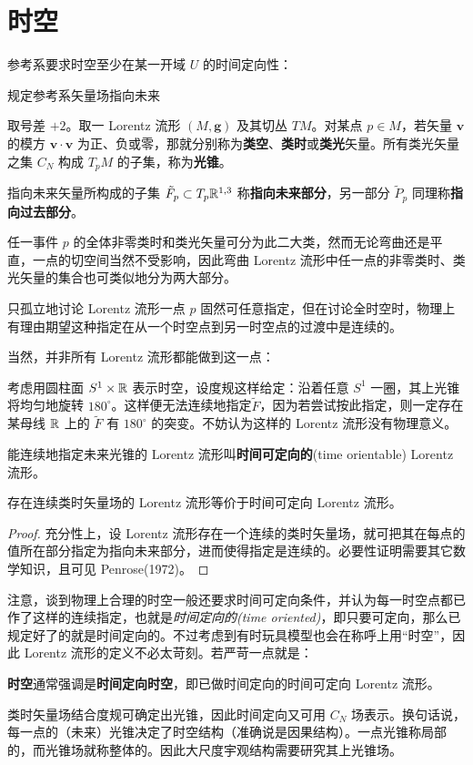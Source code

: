 \section{时空}


参考系要求时空至少在某一开域 $U$ 的时间定向性：

规定参考系矢量场指向未来

取号差 $+2$。取一 Lorentz 流形 $(M,\bm g)$ 及其切丛 $TM$。对某点 $p\in M$，若矢量 $\bm v$ 的模方 $\bm v \cdot \bm v$ 为正、负或零，那就分别称为\textbf{类空}、\textbf{类时}或\textbf{类光}矢量。所有类光矢量之集 $C_N$ 构成 $T_p M$ 的子集，称为\textbf{光锥}。

指向未来矢量所构成的子集 $\tilde F_p\subset T_p\mathbb{R}^{1,3}$ 称\textbf{指向未来部分}，另一部分 $\tilde P_p$ 同理称\textbf{指向过去部分}。

任一事件 $p$ 的全体非零类时和类光矢量可分为此二大类，然而无论弯曲还是平直，一点的切空间当然不受影响，因此弯曲 Lorentz 流形中任一点的非零类时、类光矢量的集合也可类似地分为两大部分。

只孤立地讨论 Lorentz 流形一点 $p$ 固然可任意指定，但在讨论全时空时，物理上有理由期望这种指定在从一个时空点到另一时空点的过渡中是连续的。

当然，并非所有 Lorentz 流形都能做到这一点：
    \begin{eg}
        考虑用圆柱面 $S^1\times\mathbb{R}$ 表示时空，设度规这样给定：沿着任意 $S^1$ 一圈，其上光锥将均匀地旋转 $180^\circ$。这样便无法连续地指定$\tilde F$，因为若尝试按此指定，则一定存在某母线 $\mathbb{R}$ 上的 $\tilde F$ 有 $180^\circ$ 的突变。不妨认为这样的 Lorentz 流形没有物理意义。
    \end{eg}
\begin{definition}
    能连续地指定未来光锥的 Lorentz 流形叫\textbf{时间可定向的}(time orientable) Lorentz 流形。
\end{definition}
\begin{theorem}
    存在连续类时矢量场的 Lorentz 流形等价于时间可定向 Lorentz 流形。
\end{theorem}
\begin{proof}
    充分性上，设 Lorentz 流形存在一个连续的类时矢量场，就可把其在每点的值所在部分指定为指向未来部分，进而使得指定是连续的。必要性证明需要其它数学知识，且可见 Penrose(1972)。
\end{proof}


注意，谈到物理上合理的时空一般还要求时间可定向条件，并认为每一时空点都已作了这样的连续指定，也就是\textit{时间定向的(time oriented)}，即只要可定向，那么已规定好了的就是时间定向的。不过考虑到有时玩具模型也会在称呼上用“时空”，因此 Lorentz 流形的定义不必太苛刻。若严苛一点就是：
    \begin{definition}
        \textbf{时空}通常强调是\textbf{时间定向时空}，即已做时间定向的时间可定向 Lorentz 流形。
    \end{definition}
    类时矢量场结合度规可确定出光锥，因此时间定向又可用 $C_N$ 场表示。换句话说，每一点的（未来）光锥决定了时空结构（准确说是因果结构）。一点光锥称局部的，而光锥场就称整体的。因此大尺度宇观结构需要研究其上光锥场。

